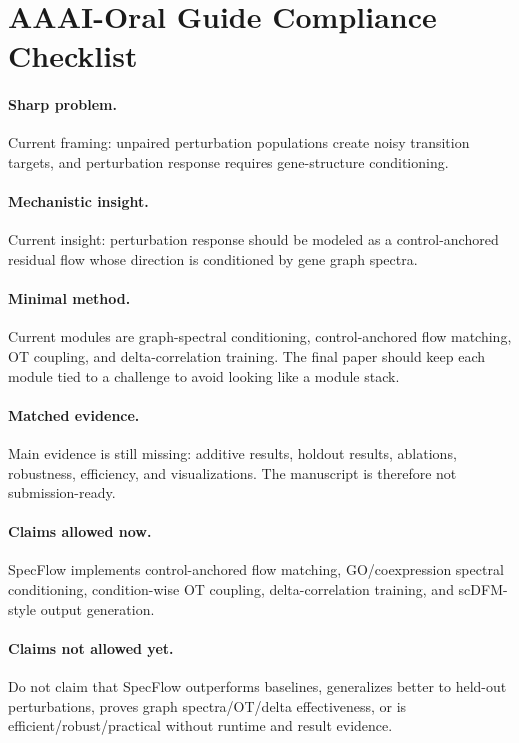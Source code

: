 \documentclass[11pt]{article}
\newcommand{\method}{SpecFlow}
\begin{document}
\section*{AAAI-Oral Guide Compliance Checklist}

\paragraph{Sharp problem.}
Current framing: unpaired perturbation populations create noisy transition targets, and perturbation response requires gene-structure conditioning.

\paragraph{Mechanistic insight.}
Current insight: perturbation response should be modeled as a control-anchored residual flow whose direction is conditioned by gene graph spectra.

\paragraph{Minimal method.}
Current modules are graph-spectral conditioning, control-anchored flow matching, OT coupling, and delta-correlation training.
The final paper should keep each module tied to a challenge to avoid looking like a module stack.

\paragraph{Matched evidence.}
Main evidence is still missing: additive results, holdout results, ablations, robustness, efficiency, and visualizations.
The manuscript is therefore not submission-ready.

\paragraph{Claims allowed now.}
\method{} implements control-anchored flow matching, GO/coexpression spectral conditioning, condition-wise OT coupling, delta-correlation training, and scDFM-style output generation.

\paragraph{Claims not allowed yet.}
Do not claim that \method{} outperforms baselines, generalizes better to held-out perturbations, proves graph spectra/OT/delta effectiveness, or is efficient/robust/practical without runtime and result evidence.
\end{document}
